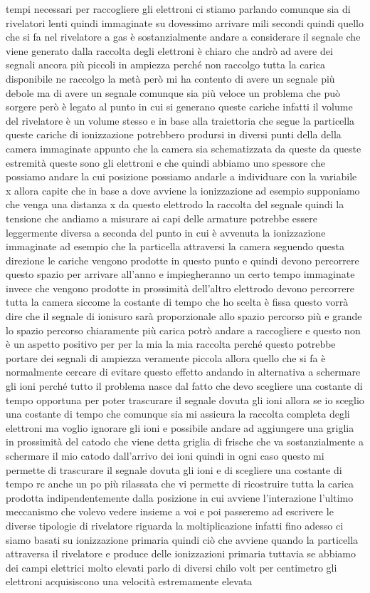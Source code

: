 tempi necessari per raccogliere gli elettroni ci stiamo parlando comunque sia di rivelatori lenti quindi immaginate su dovessimo arrivare mili secondi quindi quello che si fa nel rivelatore a gas è sostanzialmente andare a considerare il segnale che viene generato dalla raccolta degli elettroni è chiaro che andrò ad avere dei segnali ancora più piccoli in ampiezza perché non raccolgo tutta la carica disponibile ne raccolgo la metà però mi ha contento di avere un segnale più debole ma di avere un segnale comunque sia più veloce un problema che può sorgere però è legato al punto in cui si generano queste cariche infatti il volume del rivelatore è un volume stesso e in base alla traiettoria che segue la particella queste cariche di ionizzazione potrebbero prodursi in diversi punti della della camera immaginate appunto che la camera sia schematizzata da queste da queste estremità queste sono gli elettroni e che quindi abbiamo uno spessore che possiamo andare la cui posizione possiamo andarle a individuare con la variabile x allora capite che in base a dove avviene la ionizzazione ad esempio supponiamo che venga una distanza x da questo elettrodo la raccolta del segnale quindi la tensione che andiamo a misurare ai capi delle armature potrebbe essere leggermente diversa a seconda del punto in cui è avvenuta la ionizzazione immaginate ad esempio che la particella attraversi la camera seguendo questa direzione le cariche vengono prodotte in questo punto e quindi devono percorrere questo spazio per arrivare all'anno e impiegheranno un certo tempo immaginate invece che vengono prodotte in prossimità dell'altro elettrodo devono percorrere tutta la camera siccome la costante di tempo che ho scelta è fissa questo vorrà dire che il segnale di ionisuro sarà proporzionale allo spazio percorso più e grande lo spazio percorso chiaramente più carica potrò andare a raccogliere e questo non è un aspetto positivo per per la mia la mia raccolta perché questo potrebbe portare dei segnali di ampiezza veramente piccola allora quello che si fa è normalmente cercare di evitare questo effetto andando in alternativa a schermare gli ioni perché tutto il problema nasce dal fatto che devo scegliere una costante di tempo opportuna per poter trascurare il segnale dovuta gli ioni allora se io sceglio una costante di tempo che comunque sia mi assicura la raccolta completa degli elettroni ma voglio ignorare gli ioni e possibile andare ad aggiungere una griglia in prossimità del catodo che viene detta griglia di frische che va sostanzialmente a schermare il mio catodo dall'arrivo dei ioni quindi in ogni caso questo mi permette di trascurare il segnale dovuta gli ioni e di scegliere una costante di tempo rc anche un po più rilassata che vi permette di ricostruire tutta la carica prodotta indipendentemente dalla posizione in cui avviene l'interazione l'ultimo meccanismo che volevo vedere insieme a voi e poi passeremo ad escrivere le diverse tipologie di rivelatore riguarda la moltiplicazione infatti fino adesso ci siamo basati su ionizzazione primaria quindi ciò che avviene quando la particella attraversa il rivelatore e produce delle ionizzazioni primaria tuttavia se abbiamo dei campi elettrici molto elevati parlo di diversi chilo volt per centimetro gli elettroni acquisiscono una velocità estremamente elevata 